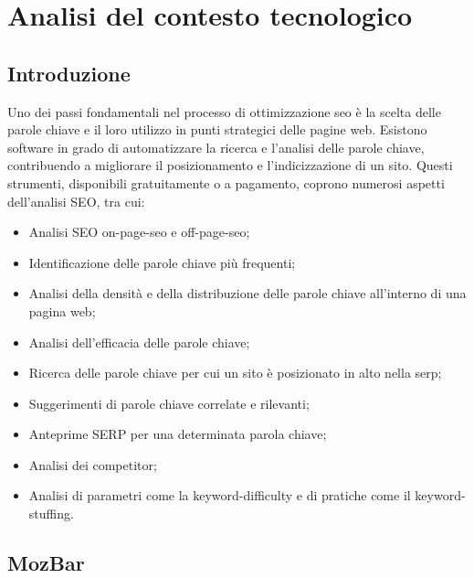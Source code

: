 \chapter{Analisi del contesto tecnologico}
\label{cap:analisi-soluzioni-esistenti}


\section{Introduzione}

\par Uno dei passi fondamentali nel processo di ottimizzazione \gls{seo} è la scelta delle parole chiave e il loro utilizzo in punti strategici delle pagine web. Esistono software in grado di automatizzare la ricerca e l'analisi delle parole chiave, contribuendo a migliorare il posizionamento e l'indicizzazione di un sito. Questi strumenti, disponibili gratuitamente o a pagamento, coprono numerosi aspetti dell'analisi SEO, tra cui:
\begin{itemize}
    \item Analisi SEO \gls{on-page-seo} e \gls{off-page-seo};
    \item Identificazione delle parole chiave più frequenti;
    \item Analisi della densità e della distribuzione delle parole chiave all'interno di una pagina web;
    \item Analisi dell'efficacia delle parole chiave;
    \item Ricerca delle parole chiave per cui un sito è posizionato in alto nella \gls{serp};
    \item Suggerimenti di parole chiave correlate e rilevanti;
    \item Anteprime SERP per una determinata parola chiave;
    \item Analisi dei competitor;
    \item Analisi di parametri come la \gls{keyword-difficulty} e di pratiche come il \gls{keyword-stuffing}.
\end{itemize}

\section{MozBar}

